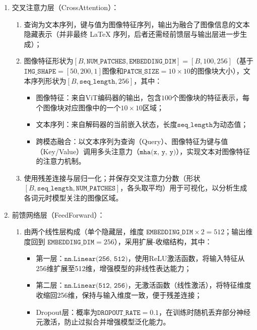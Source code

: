 \begin{enumerate}[label={（\arabic*）}, leftmargin=2em, labelsep=0.5em, itemsep=0pt]
\begin{enumerate}[label={（\alph*）}, leftmargin=2em, labelsep=0.5em, itemsep=0pt]
        \end{enumerate}
    \item 交叉注意力层（CrossAttention）：
\begin{enumerate}[label={（\alph*）}, leftmargin=2em, labelsep=0.5em, itemsep=0pt]
    \item 查询为文本序列，键与值为图像特征序列，输出为融合了图像信息的文本隐藏表示（并非最终 LaTeX 序列，后者还需经前馈层与输出层进一步生成）；
    \item 图像特征形状为$[B, \texttt{NUM\_PATCHES}, \texttt{EMBEDDING\_DIM}] = [B, 100, 256]$（基于$\texttt{IMG\_SHAPE}=[50, 200, 1]$图像和$\texttt{PATCH\_SIZE}=10 \times 10$的图像块大小），文本序列形状为$[B, \texttt{seq\_length}, 256]$，其中：
    \begin{itemize}
        \item 图像特征：来自ViT编码器的输出，包含$100$个图像块的特征表示，每个图像块对应图像中的一个$10 \times 10$区域；
        \item 文本序列：来自解码器的当前嵌入状态，长度$\texttt{seq\_length}$为动态值；
        \item 跨模态融合：以文本序列为查询（Query）、图像特征为键与值（Key/Value）调用多头注意力（$\texttt{mha(x, y, y)}$），实现文本对图像特征的注意力机制。
    \end{itemize}
    \item 使用残差连接与层归一化；并保存交叉注意力分数（形状 $[B, \texttt{seq\_length}, \texttt{NUM\_PATCHES}]$，各头取平均）用于可视化，以分析生成各词元时模型关注的图像区域。
\end{enumerate}
\item 前馈网络层（FeedForward）：
\begin{enumerate}[label={（\alph*）}, leftmargin=2em, labelsep=0.5em, itemsep=0pt]
    \item 由两个线性层构成（单个隐藏层，维度 $\texttt{EMBEDDING\_DIM} \times 2 = 512$；输出维度回到 $\texttt{EMBEDDING\_DIM} = 256$），采用扩展-收缩结构，其中：
    \begin{itemize}
        \item 第一层：$\texttt{nn.Linear(256, 512)}$，使用ReLU激活函数，将输入特征从256维扩展至512维，增强模型的非线性表达能力；
        \item 第二层：$\texttt{nn.Linear(512, 256)}$，无激活函数（线性激活），将特征维度收缩回256维，保持与输入维度一致，便于残差连接；
        \item Dropout层：概率为$\texttt{DROPOUT\_RATE}=0.1$，在训练时随机丢弃部分神经元激活，防止过拟合并增强模型泛化能力。
    \end{itemize}

\end{enumerate}
\end{enumerate}

